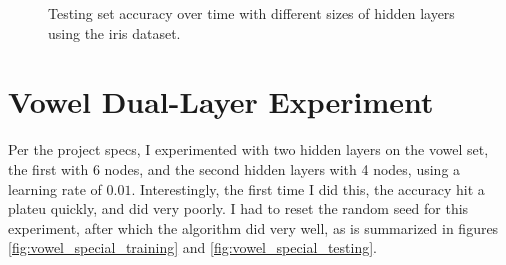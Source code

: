 \documentclass[12pt]{article}
\begin{document}
\begin{figure}[!ht]
\begin{minipage}[b]{0.45\linewidth}
        \caption{Testing set accuracy over time with different sizes of hidden layers using the iris dataset.}
        \label{fig:vowel_hiddennodes_testing}
    \end{minipage}
\end{figure}
\section{Vowel Dual-Layer Experiment}
Per the project specs, I experimented with two hidden layers on the vowel set,
the first with 6 nodes, and the second hidden layers with 4 nodes, using a
learning rate of $0.01$. Interestingly, the first time I did this, the
accuracy hit a plateu quickly, and did very poorly. I had to reset the random
seed for this experiment, after which the algorithm did very well, as is
summarized in figures \ref{fig:vowel_special_training} and
\ref{fig:vowel_special_testing}.
\end{document}
